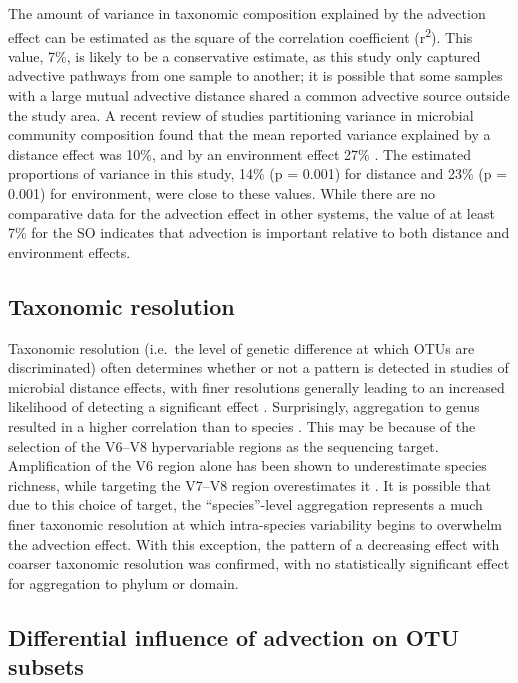 The amount of variance in taxonomic composition explained by the advection effect can be estimated as the square of the correlation coefficient (r\textsuperscript{2}).
This value, 7\%, is likely to be a conservative estimate, as this study only captured advective pathways from one sample to another; it is possible that some samples with a large mutual advective distance shared a common advective source outside the study area.
A recent review of studies partitioning variance in microbial community composition found that the mean reported variance explained by a distance effect was 10\%, and by an environment effect 27\% \cite{Hanson:2012cb}.
The estimated proportions of variance in this study, 14\% (p = 0.001) for distance and 23\% (p = 0.001) for environment, were close to these values.
While there are no comparative data for the advection effect in other systems, the value of at least 7\% for the \ac{SO} indicates that advection is important relative to both distance and environment effects. 

\subsection{Taxonomic resolution}

Taxonomic resolution (i.e.\ the level of genetic difference at which \acp{OTU} are discriminated) often determines whether or not a pattern is detected in studies of microbial distance effects, with finer resolutions generally leading to an increased likelihood of detecting a significant effect \cite{Hanson:2012cb}.
Surprisingly, aggregation to genus resulted in a higher correlation than to species .
This may be because of the selection of the V6--V8 hypervariable regions as the sequencing target.
Amplification of the V6 region alone has been shown to underestimate species richness, while targeting the V7--V8 region overestimates it \cite{Youssef:2009un}.
It is possible that due to this choice of target, the ``species''-level aggregation represents a much finer taxonomic resolution at which intra-species variability begins to overwhelm the advection effect.
With this exception, the pattern of a decreasing effect with coarser taxonomic resolution was confirmed, with no statistically significant effect for aggregation to phylum or domain.

\subsection{Differential influence of advection on OTU subsets}

